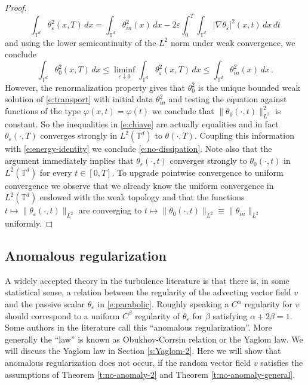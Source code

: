 \documentclass[11pt,reqno]{amsart}
\theoremstyle{definition}
\numberwithin{equation}{section}
\begin{document}
\begin{proof}
\begin{equation}\label{e:energy-identity}
\int_{\mathbb{T}^d} \theta^2_\varepsilon (x,T)\, dx = \int_{\mathbb{T}^d} \theta_{in}^2 (x)\, dx 
- 2\varepsilon \int_0^T \int_{\mathbb{T}^d} |\nabla \theta_\varepsilon|^2 (x,t)\, dx\, dt 
\end{equation}
and using the lower semicontinuity of the $L^2$ norm under weak convergence, we conclude
\begin{equation}\label{e:chiave}
\int_{\mathbb{T}^d} \theta_0^2 (x,T) \, dx \leq \liminf_{\varepsilon \downarrow 0} \int_{\mathbb{T}^d} \theta_\varepsilon^2 (x,T)\, dx 
\leq \int_{\mathbb{T}^d} \theta_{in}^2 (x)\, dx\, .
\end{equation}
However, the renormalization property gives that $\theta_0^2$ is the unique bounded weak solution of \eqref{e:transport} with initial data $\theta_{in}^2$ and testing the equation against functions of the type $\varphi (x,t) = \varphi (t)$ we conclude that $\|\theta_0 (\cdot, t)\|_{L^2}^2$ is constant. So the inequalities in \eqref{e:chiave} are actually equalities and in fact $\theta_\varepsilon (\cdot, T)$ converges strongly in $L^2 (\mathbb{T}^d)$ to $\theta (\cdot, T)$. Coupling this information with \eqref{e:energy-identity} we conclude \eqref{e:no-dissipation}. Note also that the argument immediately implies that $\theta_\varepsilon (\cdot, t)$ converges strongly to $\theta_0 (\cdot, t)$ in $L^2 (\mathbb{T}^d)$ for every $t \in [0,T]$. To upgrade pointwise convergence to uniform convergence we observe that we already know the uniform convergence in $L^2 (\mathbb{T}^d)$ endowed with the weak topology and that the functions $t\mapsto \|\theta_\varepsilon (\cdot, t)\|_{L^2}$ are converging to $t\mapsto \|\theta_0 (\cdot, t)\|_{L^2} \equiv \|\theta_{in}\|_{L^2}$ uniformly.
\end{proof}

\subsection{Anomalous regularization}\label{s:Yaglom} A widely accepted theory in the turbulence literature is that there is, in some statistical sense, a relation between the regularity of the advecting vector field $v$ and the passive scalar $\theta_\varepsilon$ in \eqref{e:parabolic}. Roughly speaking a $C^\alpha$ regularity for $v$ should correspond to a uniform $C^\beta$ regularity of $\theta_\varepsilon$ for $\beta$ satisfying $\alpha + 2\beta =1$. Some authors in the literature call this ``anomalous regularization''. More generally the ``law'' is known as Obukhov-Corrsin relation or the Yaglom law. We will discuss the Yaglom law in Section \ref{s:Yaglom-2}. Here we will show that anomalous regularization does not occur, if the random vector field $v$ satisfies the assumptions of Theorem \ref{t:no-anomaly-2} and Theorem \ref{t:no-anomaly-general}. 
\end{document}
